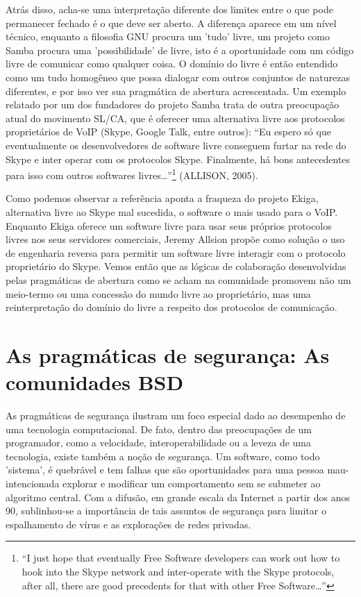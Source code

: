 Atrás disso, acha-se uma interpretação diferente dos limites entre o que pode permanecer fechado é o que deve ser aberto. A diferença aparece em um nível técnico, enquanto a filosofia GNU procura um 'tudo' livre, um projeto como Samba procura uma 'possibilidade' de livre, isto é a oportunidade com um código livre de comunicar como qualquer coisa. O domínio do livre é então entendido como um tudo homogêneo que possa dialogar com outros conjuntos de naturezas diferentes, e por isso ver sua pragmática de abertura acrescentada. Um exemplo relatado por um dos fundadores do projeto Samba trata de outra preocupação atual do movimento SL/CA, que é oferecer uma alternativa livre aos protocolos proprietários de VoIP (Skype, Google Talk, entre outros): “Eu espero só que eventualmente os desenvolvedores de software livre conseguem furtar na rede do Skype e inter operar com os protocolos Skype. Finalmente, há bons antecedentes para isso com outros softwares livres\ldots”\footnote{“I just hope that eventually Free Software developers can work out how to hook into the Skype network and inter-operate with the Skype protocols, after all, there are good precedents for that with other Free Software\ldots”} (ALLISON, 2005).

Como podemos observar a referência aponta a fraqueza do projeto Ekiga, alternativa livre ao Skype mal sucedida, o software o mais usado para o VoIP. Enquanto Ekiga oferece um software livre para usar seus próprios protocolos livres nos seus servidores comerciais, Jeremy Allsion propõe como solução o uso de engenharia reversa para permitir um software livre interagir com o protocolo proprietário do Skype. Vemos então que as lógicas de colaboração desenvolvidas pelas pragmáticas de abertura como se acham na comunidade promovem não um meio-termo ou uma concessão do mundo livre ao proprietário, mas uma reinterpretação do domínio do livre a respeito dos protocolos de comunicação.

\section{As pragmáticas de segurança: As comunidades BSD} \label{3.4}

As pragmáticas de segurança ilustram um foco especial dado ao desempenho de uma tecnologia computacional. De fato, dentro das preocupações de um programador, como a velocidade, interoperabilidade ou a leveza de uma tecnologia, existe também a noção de segurança. Um software, como todo 'sistema', é quebrável e tem falhas que são oportunidades para uma pessoa mau-intencionada explorar e modificar um comportamento sem se submeter ao algoritmo central. Com a difusão, em grande escala da Internet a partir dos anos 90, sublinhou-se a importância de tais assuntos de segurança para limitar o espalhamento de vírus e as explorações de redes privadas.

